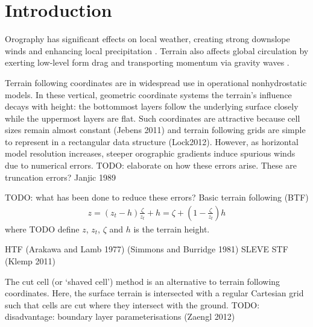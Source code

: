 \chapter{Introduction}


Orography has significant effects on local weather, creating strong downslope winds and enhancing local precipitation \autocite{TODO}.  Terrain also affects global circulation by exerting low-level form drag \autocite{lottmiller1997} and transporting momentum via gravity waves \autocite{mcfarlane1987}.



Terrain following coordinates are in widespread use in operational nonhydrostatic models.  In these vertical, geometric coordinate systems the terrain's influence decays with height: the bottommost layers follow the underlying surface closely while the uppermost layers are flat.  Such coordinates are attractive because cell sizes remain almost constant (Jebens 2011) and terrain following grids are simple to represent in a rectangular data structure (Lock2012).  However, as horizontal model resolution increases, steeper orographic gradients induce spurious winds due to numerical errors. \autocite{TODO}  TODO: elaborate on how these errors arise.  These are truncation errors?  Janjic 1989

TODO: what has been done to reduce these errors?
Basic terrain following (BTF) \autocite{galchen1975} 
\begin{align}
z = \left( z_t - h \right) \frac{\zeta}{z_t} + h = \zeta + \left( 1 - \frac{\zeta}{z_t} \right) h
\end{align}
where TODO define $z$, $z_t$, $\zeta$ and $h$ is the terrain height.

HTF (Arakawa and Lamb 1977) (Simmons and Burridge 1981)
SLEVE
STF (Klemp 2011)

The cut cell (or `shaved cell')  method is an alternative to terrain following coordinates.  Here, the surface terrain is intersected with a regular Cartesian grid such that cells are cut where they intersect with the ground.  TODO: disadvantage: boundary layer parameterisations (Zaengl 2012)
